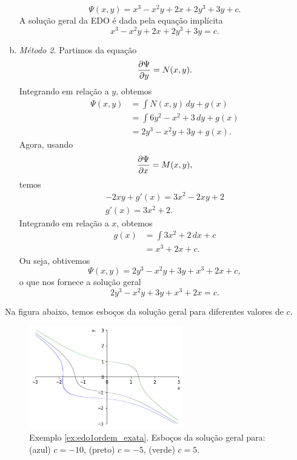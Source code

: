 \begin{ex}
\begin{enumerate}[a)]
\begin{equation}
      \Psi(x,y) = x^3 - x^2y + 2x + 2y^3 + 3y + c.
    \end{equation}
    A solução geral da EDO é dada pela equação implícita
    \begin{equation}
      x^3 - x^2y + 2x + 2y^3 + 3y = c.
    \end{equation}
  \item \emph{Método 2.}
    Partimos da equação
    \begin{equation}
      \frac{\partial\Psi}{\partial y} = N(x,y).
    \end{equation}
    Integrando em relação a $y$, obtemos
    \begin{align}
      \Psi(x,y) &= \int N(x,y)\,dy + g(x)\\
      &= \int 6y^2 - x^2 + 3\,dy + g(x) \\
      &= 2y^3 - x^2y + 3y + g(x).
    \end{align}
    Agora, usando
    \begin{equation}
      \frac{\partial\Psi}{\partial x} = M(x,y),
    \end{equation}
    temos
    \begin{gather}
      -2xy + g'(x) = 3x^2 - 2xy + 2 \\
      g'(x) = 3x^2 + 2.
    \end{gather}
    Integrando em relação a $x$, obtemos
    \begin{align}
      g(x) &= \int 3x^2 + 2\,dx + c \\
      &= x^3 + 2x + c.
    \end{align}
    Ou seja, obtivemos
    \begin{equation}
      \Psi(x,y) = 2y^3 - x^2y + 3y + x^3 + 2x + c,
    \end{equation}
    o que nos fornece a solução geral
    \begin{equation}
      2y^3 - x^2y + 3y + x^3 + 2x = c.
    \end{equation}
  \end{enumerate}

  Na figura abaixo, temos esboços da solução geral para diferentes valores de $c$.

  \begin{figure}[H]
    \centering
    \includegraphics[width=0.6\textwidth]{./cap_edo1ordem/dados/fig_ex_edo1ordem_exata/fig_ex_edo1ordem_exata}
    \caption{Exemplo \ref{ex:edo1ordem_exata}. Esboços da solução geral para: (azul) $c=-10$, (preto) $c=-5$, (verde) $c=5$.}
    \label{fig:ex_edo1ordem_exata}
  \end{figure}
  

\end{ex}
